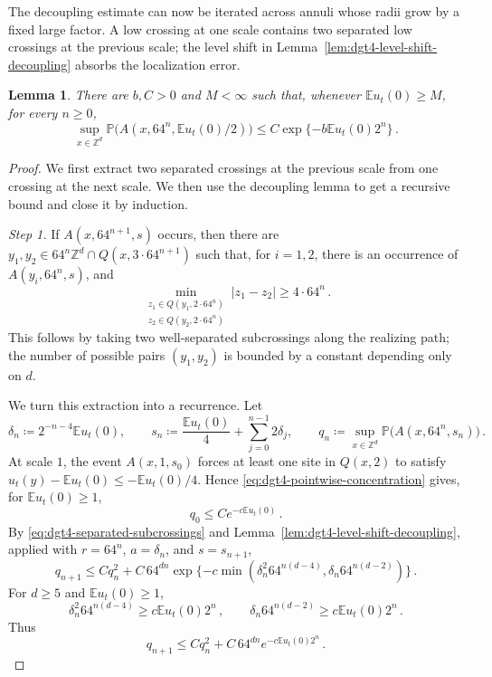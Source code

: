 \documentclass[11pt]{amsart}
\theoremstyle{plain}
\newtheorem{lemma}[theorem]{Lemma}
\theoremstyle{definition}
\newcommand{\Z}{\mathbb{Z}}
\newcommand{\E}{\mathbb{E}}
\renewcommand{\P}{\mathbb{P}}
\begin{document}
	The decoupling estimate can now be iterated across annuli whose radii grow
	by a fixed large factor. A low crossing at one scale contains two separated
	low crossings at the previous scale; the level shift in
	Lemma~\ref{lem:dgt4-level-shift-decoupling} absorbs the localization error.
	\begin{lemma}\label{lem:dgt4-cascade}
		There are $b,C>0$ and $M<\infty$ such that, whenever
		$\E u_t(0)\geq M$, for every $n\geq0$,
		\begin{equation}
			\sup_{x\in\Z^d}\P\bigl(A(x,64^n,\E u_t(0)/2)\bigr)
			\leq
			C\exp\{-b\E u_t(0)2^n\}\, .
			\label{eq:dgt4-cascade-bound}
		\end{equation}
		\end{lemma}
		\begin{proof}
			We first extract two separated crossings at the previous scale from
			one crossing at the next scale. We then use the decoupling lemma to
			get a recursive bound and close it by induction.

			\emph{Step 1.} If $A(x,64^{n+1},s)$ occurs, then there are
			$y_1,y_2\in 64^n\Z^d\cap Q(x,3\cdot64^{n+1})$ such that, for
			$i=1,2$, there is an occurrence of $A(y_i,64^n,s)$, and
			\begin{equation}\label{eq:dgt4-separated-subcrossings}
				\min_{\substack{z_1\in Q(y_1,2\cdot64^n)\\ z_2\in Q(y_2,2\cdot64^n)}} |z_1-z_2|
				\geq4\cdot64^n\, .
			\end{equation}
			This follows by taking two well-separated subcrossings along the
			realizing path; the number of possible pairs $(y_1,y_2)$ is bounded
			by a constant depending only on $d$.

			We turn this extraction into a recurrence. Let
			\[
				\delta_n\coloneqq2^{-n-4}\E u_t(0),
				\qquad
				s_n\coloneqq\frac{\E u_t(0)}{4}
				+\sum_{j=0}^{n-1}2\delta_j,
				\qquad
				q_n\coloneqq\sup_{x\in\Z^d}
				\P\bigl(A(x,64^n,s_n)\bigr)\, .
			\]
			At scale $1$, the event $A(x,1,s_0)$ forces at least one site
			in $Q(x,2)$ to satisfy
			$u_t(y)-\E u_t(0)\leq-\E u_t(0)/4$. Hence
			\eqref{eq:dgt4-pointwise-concentration} gives, for $\E u_t(0)\geq1$,
			\[
				q_0\leq Ce^{-c\E u_t(0)}\, .
			\]
			By \eqref{eq:dgt4-separated-subcrossings} and
			Lemma~\ref{lem:dgt4-level-shift-decoupling}, applied with
			$r=64^n$, $a=\delta_n$, and $s=s_{n+1}$,
			\[
				q_{n+1}
				\leq
				Cq_n^2
				+
				C\,64^{dn}
				\exp\{-c\min(\delta_n^2 64^{n(d-4)}, \delta_n64^{n(d-2)})\}\, .
			\]
			For $d\geq5$ and $\E u_t(0)\geq1$,
			\[
				\delta_n^2 64^{n(d-4)}\geq c\E u_t(0)2^n\, ,
				\qquad
				\delta_n64^{n(d-2)}\geq c\E u_t(0)2^n\, .
			\]
			Thus
			\begin{equation}\label{eq:dgt4-cascade-recursion}
				q_{n+1}
				\leq
				Cq_n^2+C\,64^{dn}e^{-c\E u_t(0)2^n}\, .
			\end{equation}


\end{proof}
\end{document}
